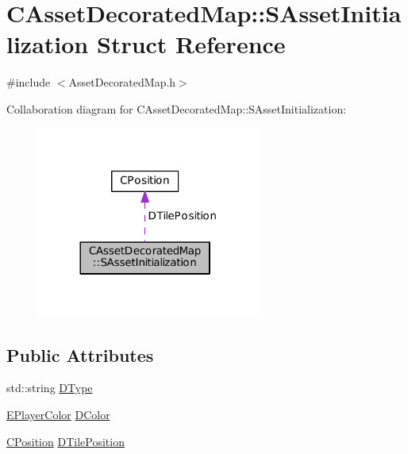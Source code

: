 \hypertarget{structCAssetDecoratedMap_1_1SAssetInitialization}{}\section{C\+Asset\+Decorated\+Map\+:\+:S\+Asset\+Initialization Struct Reference}
\label{structCAssetDecoratedMap_1_1SAssetInitialization}


{\ttfamily \#include $<$Asset\+Decorated\+Map.\+h$>$}



Collaboration diagram for C\+Asset\+Decorated\+Map\+:\+:S\+Asset\+Initialization\+:
\nopagebreak
\begin{figure}[H]
\begin{center}
\leavevmode
\includegraphics[width=209pt]{structCAssetDecoratedMap_1_1SAssetInitialization__coll__graph}
\end{center}
\end{figure}
\subsection*{Public Attributes}
\begin{DoxyCompactItemize}
\item 
std\+::string \hyperlink{structCAssetDecoratedMap_1_1SAssetInitialization_acc1ab65366ed9e00080b71c541f3b72d}{D\+Type}
\item 
\hyperlink{GameDataTypes_8h_aafb0ca75933357ff28a6d7efbdd7602f}{E\+Player\+Color} \hyperlink{structCAssetDecoratedMap_1_1SAssetInitialization_a56ad740f8d319066e5ef5781fe6c636f}{D\+Color}
\item 
\hyperlink{classCPosition}{C\+Position} \hyperlink{structCAssetDecoratedMap_1_1SAssetInitialization_a2579060dadc045d36f4e316096827471}{D\+Tile\+Position}
\end{DoxyCompactItemize}


